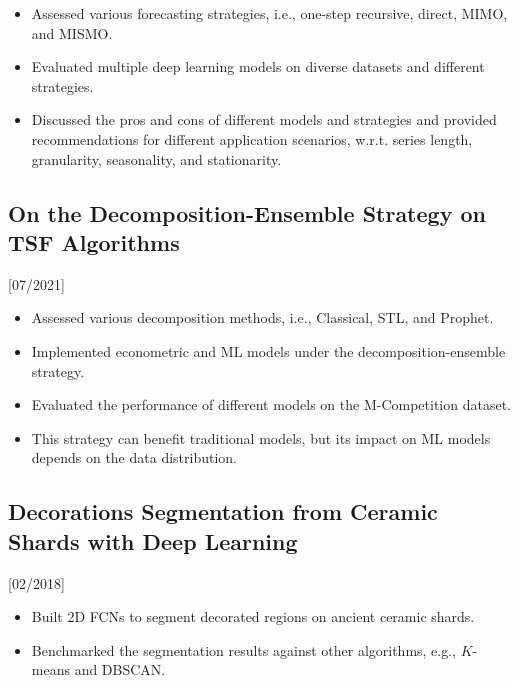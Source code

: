 \documentclass{mycv}
\begin{document}
\begin{itemize}
  \item Assessed various forecasting strategies, i.e., one-step recursive, direct, MIMO, and MISMO.
  \item Evaluated multiple deep learning models on diverse datasets and different strategies.
  \item Discussed the pros and cons of different models and strategies and provided recommendations for different application scenarios, w.r.t. series length, granularity, seasonality, and stationarity.
\end{itemize}

\vspace{-\parskip}

\subsection{On the Decomposition-Ensemble Strategy on TSF Algorithms}[07/2021]

\vspace{-\parskip}

\begin{itemize}
  \item Assessed various decomposition methods, i.e., Classical, STL, and Prophet.
  \item Implemented econometric and ML models under the decomposition-ensemble strategy.
  \item Evaluated the performance of different models on the M-Competition dataset.
  \item This strategy can benefit traditional models, but its impact on ML models depends on the data distribution.
\end{itemize}

\vspace{-\parskip}

\subsection{Decorations Segmentation from Ceramic Shards with Deep Learning}[02/2018]

\vspace{-\parskip}

\begin{itemize}
  \item Built 2D FCNs to segment decorated regions on ancient ceramic shards.
  \item Benchmarked the segmentation results against other algorithms, e.g., $K$-means and DBSCAN.
\end{itemize}
\end{document}
